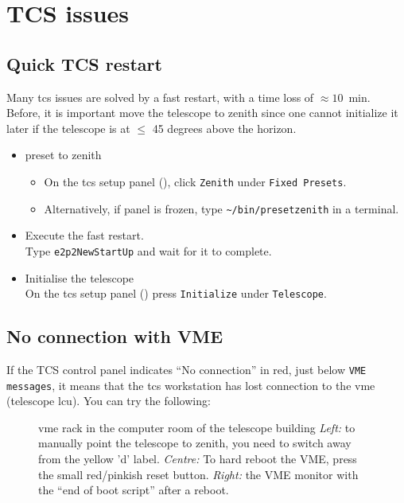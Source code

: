 \documentclass[11pt,fleqn,a4paper]{book}
\def\home{\textasciitilde{}}
\begin{document}
\section{TCS issues}
\subsection{Quick TCS restart}
\label{sec:tcsrestart}

Many \gls{tcs} issues are solved by a fast restart, with a time loss of $\approx 10$~min. Before, it is important move the telescope to zenith since one cannot initialize it later if the telescope is at $\le$ 45 degrees above the horizon.

\begin{itemize}
 \item \gls{preset} to zenith
    \begin{itemize}
	\item On the \gls{tcs} setup panel (), click \texttt{Zenith} under \texttt{Fixed Presets}.
        \item Alternatively, if panel is frozen, type \texttt{\home/bin/presetzenith} in a terminal.
    \end{itemize}
 \item Execute the fast restart.\\
       Type \texttt{e2p2NewStartUp} and wait for it to complete.
 \item Initialise the telescope\\
       On the \gls{tcs} setup panel () press \texttt{Initialize} under \texttt{Telescope}.
\end{itemize}

\subsection{No connection with VME}
If the \gls{TCS control panel} indicates ``No connection'' in red, just below \texttt{VME messages}, it means that the \gls{tcs} workstation has lost connection to the \gls{vme} (telescope \gls{lcu}). You can try the following:

\begin{figure}
\centering
{}%
\caption[VME rack in the computer room of the telescope building]{\gls{vme} rack in the \gls{computer room} of the telescope building 
\emph{Left:} to
manually point the telescope to zenith, you need to switch away from 
the yellow 'd' label. \emph{Centre:} To hard reboot the VME, press the small red/pinkish reset button. \emph{Right:} the VME monitor with the ``end of boot script'' after a reboot.}
\end{figure}
\end{document}
